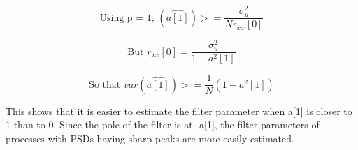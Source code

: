 \documentclass{article}
\begin{document}
\begin{equation}
\text{Using p = 1,  } (\hat{a[1]}) >= \frac{\sigma_u^2}{Nr_{xx}[0]}
\end{equation}

\begin{equation}
\text{But  } r_{xx}[0] = \frac{\sigma_u^2}{1-a^2[1]}
\end{equation}

\begin{equation}
\text{So that  } var(\hat{a[1]}) >= \frac{1}{N} (1-a^2[1])
\end{equation}

This shows that it is easier to estimate the filter parameter when a[1] is closer to 1 than to 0. Since the pole of the filter is at -a[1], the filter parameters of processes with PSDs having sharp peaks are more easily estimated.
\end{document}
